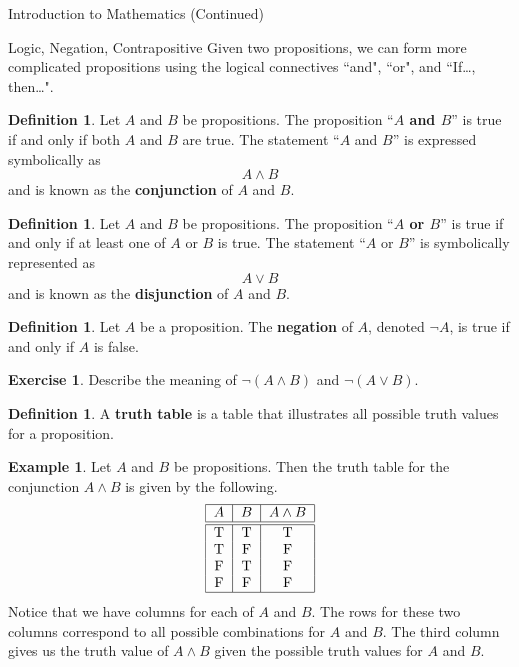 \documentclass[11pt]{article}
\theoremstyle{definition}
\newtheorem{definition}[theorem]{Definition}
\newtheorem{example}[theorem]{Example}
\newtheorem{exercise}[theorem]{Exercise}
\begin{document}
\begin{section}{Introduction to Mathematics (Continued)}
\begin{subsection}{Logic, Negation, Contrapositive}
Given two propositions, we can form more complicated propositions using the logical connectives ``and", ``or", and ``If\ldots, then\ldots".

\begin{definition}
Let $A$ and $B$ be propositions.  The proposition ``\textbf{$A$ and $B$}'' is true if and only if both $A$ and $B$ are true.  The statement ``$A$ and $B$'' is expressed symbolically as 
\[
A \wedge B
\]
and is known as the \textbf{conjunction} of $A$ and $B$.
\end{definition}

\begin{definition}
Let $A$ and $B$ be propositions.  The proposition ``\textbf{$A$ or $B$}'' is true if and only if at least one of $A$ or $B$ is true.  The statement ``$A$ or $B$'' is symbolically represented as
\[
A \vee B
\]
and is known as the \textbf{disjunction} of $A$ and $B$.
\end{definition}

\begin{definition}
Let $A$ be a proposition.  The \textbf{negation} of $A$, denoted $\neg A$, is true if and only if $A$ is false.
\end{definition}

\begin{exercise}Describe the meaning of $\neg (A \wedge B)$ and $\neg (A \vee B)$.
\end{exercise}

\begin{definition}
A \textbf{truth table} is a table that illustrates all possible truth values for a proposition.  
\end{definition}

\begin{example}
Let $A$ and $B$ be propositions.  Then the truth table for the conjunction $A\wedge B$ is given by the following.
\[
\begin{tabular}{| c | c  | c |} \hline
$A$  &  $B$ & $A \wedge B$  \\ \hline\hline
T & T & T  \\ 
T & F & F  \\ 
F & T & F  \\ 
F & F & F  \\ \hline
\end{tabular}
\]
Notice that we have columns for each of $A$ and $B$.  The rows for these two columns correspond to all possible combinations for $A$ and $B$.  The third column gives us the truth value of $A\wedge B$ given the possible truth values for $A$ and $B$.
\end{example}


\end{subsection}
\end{section}
\end{document}
